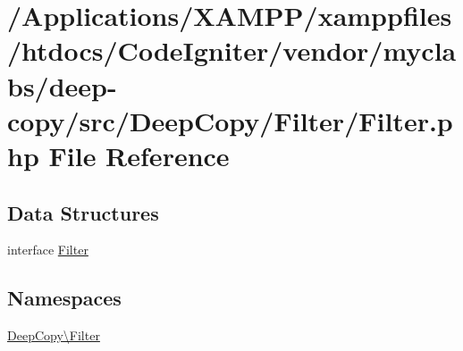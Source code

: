 \hypertarget{myclabs_2deep-copy_2src_2_deep_copy_2_filter_2_filter_8php}{}\section{/\+Applications/\+X\+A\+M\+P\+P/xamppfiles/htdocs/\+Code\+Igniter/vendor/myclabs/deep-\/copy/src/\+Deep\+Copy/\+Filter/\+Filter.php File Reference}
\label{myclabs_2deep-copy_2src_2_deep_copy_2_filter_2_filter_8php}
\subsection*{Data Structures}
\begin{DoxyCompactItemize}
\item 
interface \mbox{\hyperlink{interface_deep_copy_1_1_filter_1_1_filter}{Filter}}
\end{DoxyCompactItemize}
\subsection*{Namespaces}
\begin{DoxyCompactItemize}
\item 
 \mbox{\hyperlink{namespace_deep_copy_1_1_filter}{Deep\+Copy\textbackslash{}\+Filter}}
\end{DoxyCompactItemize}
